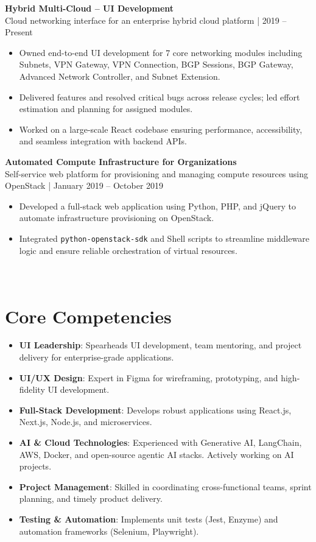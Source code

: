\documentclass[11pt, a4paper]{article}
\newcommand{\smallgray}[1]{\textcolor{darkgray!90}{\small #1}}
\begin{document}
\textbf{Hybrid Multi-Cloud – UI Development} \\
\smallgray{Cloud networking interface for an enterprise hybrid cloud platform | 2019 -- Present}
\begin{itemize}
    \item Owned end-to-end UI development for 7 core networking modules including Subnets, VPN Gateway, VPN Connection, BGP Sessions, BGP Gateway, Advanced Network Controller, and Subnet Extension.
    \item Delivered features and resolved critical bugs across release cycles; led effort estimation and planning for assigned modules.
    \item Worked on a large-scale React codebase ensuring performance, accessibility, and seamless integration with backend APIs.
\end{itemize}

\textbf{Automated Compute Infrastructure for Organizations} \\
\smallgray{Self-service web platform for provisioning and managing compute resources using OpenStack | January 2019 -- October 2019}
\begin{itemize}
    \item Developed a full-stack web application using Python, PHP, and jQuery to automate infrastructure provisioning on OpenStack.
    \item Integrated \texttt{python-openstack-sdk} and Shell scripts to streamline middleware logic and ensure reliable orchestration of virtual resources.
\end{itemize}

\section{\\ Core Competencies}
\begin{itemize}
    \item \textbf{UI Leadership}: Spearheads UI development, team mentoring, and project delivery for enterprise-grade applications.
    \item \textbf{UI/UX Design}: Expert in Figma  for wireframing, prototyping, and high-fidelity UI development.
    \item \textbf{Full-Stack Development}: Develops robust applications using React.js, Next.js, Node.js, and microservices.
    \item \textbf{AI \& Cloud Technologies}: Experienced with Generative AI, LangChain, AWS, Docker, and open-source agentic AI stacks. Actively working on AI projects.
    \item \textbf{Project Management}: Skilled in coordinating cross-functional teams, sprint planning, and timely product delivery.
    \item \textbf{Testing \& Automation}: Implements unit tests (Jest, Enzyme) and automation frameworks (Selenium, Playwright).
\end{itemize}
\end{document}
